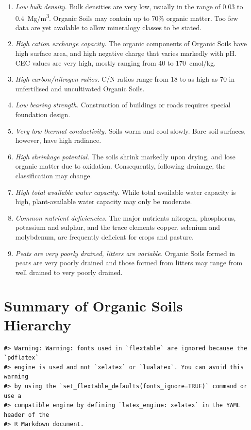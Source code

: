 \documentclass[
  letterpaper,
  DIV=11,
  numbers=noendperiod]{scrreprt}
\providecommand{\tightlist}{%
  \setlength{\itemsep}{0pt}\setlength{\parskip}{0pt}}\usepackage{longtable,booktabs,array}
\begin{document}
\begin{enumerate}
\def\labelenumi{\arabic{enumi}.}
\tightlist
\item
  \emph{Low bulk density.} Bulk densities are very low, usually in the
  range of 0.03 to 0.4~Mg/m\textsuperscript{3}. Organic Soils may
  contain up to 70\% organic matter. Too few data are yet available to
  allow mineralogy classes to be stated.
\item
  \emph{High cation exchange capacity.} The organic components of
  Organic Soils have high surface area, and high negative charge that
  varies markedly with pH. CEC values are very high, mostly ranging from
  40 to 170~cmol/kg.
\item
  \emph{High carbon/nitrogen ratios.} C/N ratios range from 18 to as
  high as 70 in unfertilised and uncultivated Organic Soils.
\item
  \emph{Low bearing strength.} Construction of buildings or roads
  requires special foundation design.
\item
  \emph{Very low thermal conductivity.} Soils warm and cool slowly. Bare
  soil surfaces, however, have high radiance.
\item
  \emph{High shrinkage potential.} The soils shrink markedly upon
  drying, and lose organic matter due to oxidation. Consequently,
  following drainage, the classification may change.
\item
  \emph{High total available water capacity.} While total available
  water capacity is high, plant-available water capacity may only be
  moderate.
\item
  \emph{Common nutrient deficiencies.} The major nutrients nitrogen,
  phosphorus, potassium and sulphur, and the trace elements copper,
  selenium and molybdenum, are frequently deficient for crops and
  pasture.
\item
  \emph{Peats are very poorly drained, litters are variable.} Organic
  Soils formed in peats are very poorly drained and those formed from
  litters may range from well drained to very poorly drained.
\end{enumerate}

\hypertarget{sec-sum-O}{%
\section{Summary of Organic Soils Hierarchy}\label{sec-sum-O}}

\begin{verbatim}
#> Warning: Warning: fonts used in `flextable` are ignored because the `pdflatex`
#> engine is used and not `xelatex` or `lualatex`. You can avoid this warning
#> by using the `set_flextable_defaults(fonts_ignore=TRUE)` command or use a
#> compatible engine by defining `latex_engine: xelatex` in the YAML header of the
#> R Markdown document.
\end{verbatim}
\end{document}
